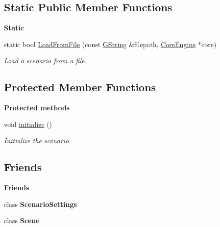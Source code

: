 \subsection*{Static Public Member Functions}
\begin{Indent}\textbf{ Static}\par
\begin{DoxyCompactItemize}
\item 
static bool \mbox{\hyperlink{classrev_1_1_scenario_ac313e7e73ffbd6a1e3d6fd98c2f191eb}{Load\+From\+File}} (const \mbox{\hyperlink{classrev_1_1_g_string}{G\+String}} \&filepath, \mbox{\hyperlink{classrev_1_1_core_engine}{Core\+Engine}} $\ast$core)
\begin{DoxyCompactList}\small\item\em Load a scenario from a file. \end{DoxyCompactList}\end{DoxyCompactItemize}
\end{Indent}
\subsection*{Protected Member Functions}
\begin{Indent}\textbf{ Protected methods}\par
\begin{DoxyCompactItemize}
\item 
\mbox{\label{classrev_1_1_scenario_aa6d7ad6e90bdae642d5659250a1d6638}} 
void \mbox{\hyperlink{classrev_1_1_scenario_aa6d7ad6e90bdae642d5659250a1d6638}{initialize}} ()
\begin{DoxyCompactList}\small\item\em Initialize the scenario. \end{DoxyCompactList}\end{DoxyCompactItemize}
\end{Indent}
\subsection*{Friends}
\begin{Indent}\textbf{ Friends}\par
\begin{DoxyCompactItemize}
\item 
\mbox{\label{classrev_1_1_scenario_a8f9d7c07baf107066aee60e2e6a09448}} 
class {\bfseries Scenario\+Settings}
\item 
\mbox{\label{classrev_1_1_scenario_a032858ae1fe02d2d1170981c2af2d67c}} 
class {\bfseries Scene}
\end{DoxyCompactItemize}
\end{Indent}

